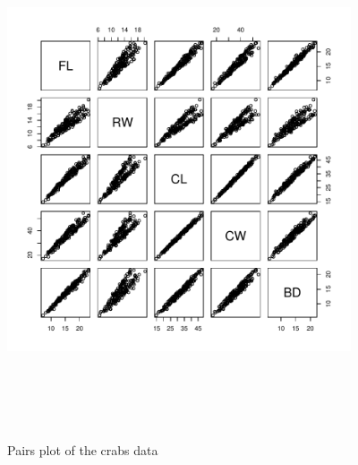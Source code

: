 \documentclass[,12pt]{article}
\begin{document}
\begin{figure}[htbp]
\begin{center}
\includegraphics[height=6in,width=4in]{vignplot1}
\end{center}
\caption{Pairs plot of the crabs data}
\label{plot1}
\end{figure}
\end{document}
